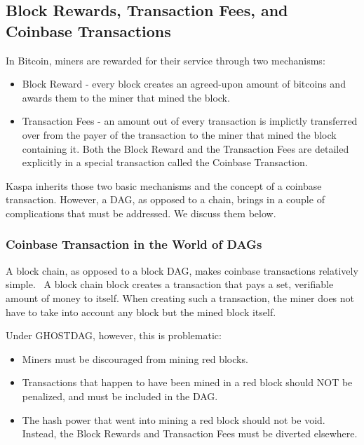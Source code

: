 \subsection{Block Rewards, Transaction Fees, and Coinbase Transactions}
\label{part2:kaspad:consensus:block_reward}

In Bitcoin, miners are rewarded for their service through two mechanisms:
\begin{itemize}
    \item  Block Reward - every block creates an agreed-upon amount of bitcoins and awards them to the miner that mined the block.
    \item Transaction Fees - an amount out of every transaction is implictly transferred over from the payer of the transaction to the miner that mined the block containing it.
Both the Block Reward and the Transaction Fees are detailed explicitly in a special transaction called the Coinbase Transaction.
\end{itemize}


Kaspa inherits those two basic mechanisms and the concept of a coinbase transaction. However, a DAG, as opposed to a chain, brings in a couple of complications that must be addressed. We discuss them below.


\subsubsection{Coinbase Transaction in the World of DAGs}

A block chain, as opposed to a block DAG, makes coinbase transactions relatively simple. \
A block chain block creates a transaction that pays a set, verifiable amount of money to itself. When creating such a transaction, the miner does not have to take into account any block but the mined block itself.

Under GHOSTDAG, however, this is problematic:
\begin{itemize}
\item Miners must be discouraged from mining red blocks.
\item Transactions that happen to have been mined in a red block should NOT be penalized, and must be included in the DAG.
\item The hash power that went into mining a red block should not be void. Instead, the Block Rewards and Transaction Fees must be diverted elsewhere.
\end{itemize}



